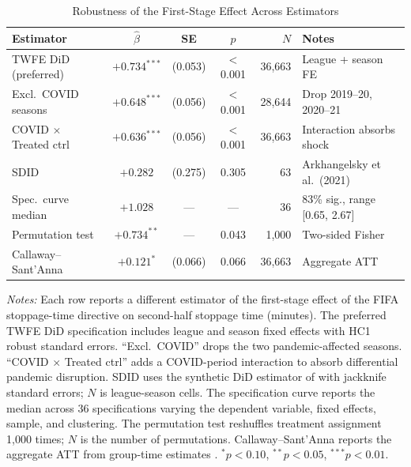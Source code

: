\begin{table}[htbp]
\centering
\begin{threeparttable}
\caption{Robustness of the First-Stage Effect Across Estimators}
\label{tab:robustness}
\begin{tabular}{lcccrl}
\toprule
Estimator & $\hat{\beta}$ & SE & $p$ & $N$ & Notes \\
\midrule
TWFE DiD (preferred)        & $+0.734^{***}$ & (0.053) & $<$0.001 & 36,663 & League + season FE \\
Excl.\ COVID seasons        & $+0.648^{***}$ & (0.056) & $<$0.001 & 28,644 & Drop 2019--20, 2020--21 \\
COVID $\times$ Treated ctrl & $+0.636^{***}$ & (0.056) & $<$0.001 & 36,663 & Interaction absorbs shock \\
SDID                        & $+0.282$       & (0.275) & 0.305    &     63 & Arkhangelsky et al.\ (2021) \\
Spec.\ curve median         & $+1.028$       &   ---   &   ---    &     36 & 83\% sig., range [0.65, 2.67] \\
Permutation test            & $+0.734^{**}$  &   ---   & 0.043    &  1,000 & Two-sided Fisher \\
Callaway--Sant'Anna          & $+0.121^{*}$   & (0.066) & 0.066    & 36,663 & Aggregate ATT \\
\bottomrule
\end{tabular}
\begin{tablenotes}[flushleft]
\footnotesize
\item \textit{Notes:} Each row reports a different estimator of the first-stage effect of
the FIFA stoppage-time directive on second-half stoppage time (minutes). The preferred
TWFE DiD specification includes league and season fixed effects with HC1 robust standard
errors. ``Excl.\ COVID'' drops the two pandemic-affected seasons. ``COVID $\times$ Treated
ctrl'' adds a COVID-period interaction to absorb differential pandemic disruption. SDID
uses the synthetic DiD estimator of \citet{arkhangelsky2021synthetic} with jackknife standard
errors; $N$ is league-season cells. The specification curve reports the median across 36
specifications varying the dependent variable, fixed effects, sample, and clustering.
The permutation test reshuffles treatment assignment 1,000 times; $N$ is the number of
permutations. Callaway--Sant'Anna reports the aggregate ATT from group-time estimates
\citep{callaway2021difference}. $^{*}p<0.10$, $^{**}p<0.05$, $^{***}p<0.01$.
\end{tablenotes}
\end{threeparttable}
\end{table}
